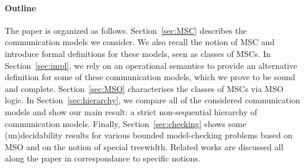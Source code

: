 \paragraph{\bf Outline} The paper is organized as follows. Section~\ref{sec:MSC} describes the communication models we consider. We also recall the notion of MSC and introduce formal definitions for these models, seen as classes of MSCs.
In Section~\ref{sec:impl}, we rely on
an operational semantics to provide an alternative definition for some of these communication models, which we prove to be sound and complete.
Section~\ref{sec:MSO} characterises the classes of MSCs via MSO logic.
In Section~\ref{sec:hierarchy}, we compare all of the considered communication models and show our main result: a strict non-sequential hierarchy of communication models.
Finally, Section~\ref{sec:checking} shows some (un)decidability results for various bounded model-checking
problems based on MSO and on the notion of special treewidth. Related works are discussed all along the paper in correspondance to specific notions.


